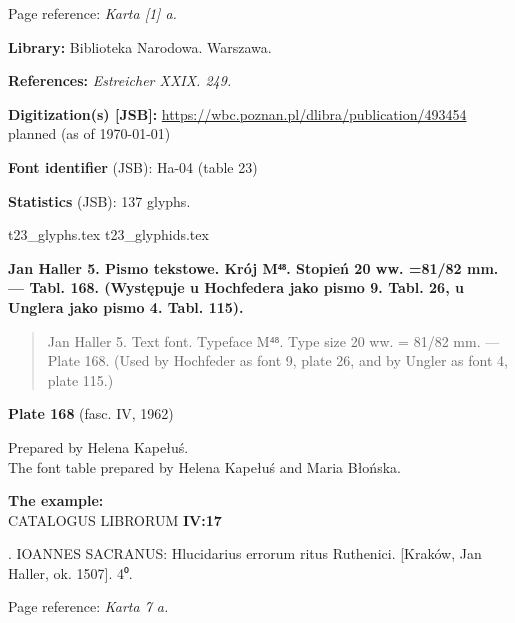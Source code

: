 \documentclass[12pt]{article}
\newcommand{\bg}{\begingl}
\newcommand{\pismoPL}[1]{{\relsize{2}\Junicode\textbf{#1}}}
\newcommand{\pismoEN}[1]{{\relsize{1}\Junicode\begin{quote}#1\end{quote}}}
\newcommand{\plate}[3]{\textbf{Plate #1} (fasc. #2, #3)}
\newcommand{\exampleBib}[1]{{\relsize{2}\Junicode\textbf{The
      example:}\\[2ex] CATALOGUS LIBRORUM \textbf{#1}}}
\newcommand{\exampleDesc}[1]{{\relsize{0}\Junicode#1}}
\newcommand{\exampleDig}[1]{{\relsize{0}\Junicode \textbf{Digitization(s) [JSB]:} #1}}
\newcommand{\exampleLib}[1]{{\relsize{0}\Junicode \textbf{Library:} #1}}
\newcommand{\examplePL}[1]{}
\newcommand{\exampleEN}[1]{}
\newcommand{\fontID}[2]{{\relsize{1}\Junicode\textbf{Font identifier} (JSB): #1 (table #2)}}
\newcommand{\fontstat}[1]{{\relsize{1}\Junicode\textbf{Statistics} (JSB): #1 glyphs.}}
\newcommand{\exampleRef}[1]{{\relsize{0}\Junicode \textbf{References:} #1}}
\newcommand{\examplePage}[1]{{Page reference: \relsize{0}\Junicode#1}}
\begin{document}
\medskip
\examplePage{\textit{Karta [1] a.}}

  \bigskip
\exampleLib{Biblioteka Narodowa. Warszawa.}

\bigskip
\exampleRef{\textit{Estreicher XXIX. 249.}}

\bigskip
\exampleDig{\url{https://wbc.poznan.pl/dlibra/publication/493454} planned (as of \today)}






\bigskip


\fontID{Ha-04}{23}

\fontstat{137}

  {t23_glyphs.tex}
  {t23_glyphids.tex}

\newpage



  \pismoPL{Jan Haller 5. Pismo tekstowe. Krój M⁴⁸. Stopień 20
    ww. =81/82 mm. — Tabl. 168. (Występuje u Hochfedera jako pismo
    9. Tabl. 26, u Unglera jako pismo 4.  Tabl. 115).}


  
\pismoEN{Jan Haller 5. Text font. Typeface M⁴⁸. Type size 20 ww. =
    81/82 mm. — Plate 168. (Used by Hochfeder as font 9, plate
    26, and by Ungler as font 4, plate 115.)}

\plate{168}{IV}{1962}

Prepared by Helena Kapełuś.\\
The font table prepared by Helena Kapełuś and Maria Błońska.

\bigskip

\exampleBib{IV:17}

\bigskip
\exampleDesc{17. IOANNES SACRANUS: Hlucidarius errorum ritus Ruthenici. [Kraków, Jan Haller, ok. 1507]. 4⁰.}
  

\medskip
\examplePage{\textit{Karta 7 a.}}
\end{document}
